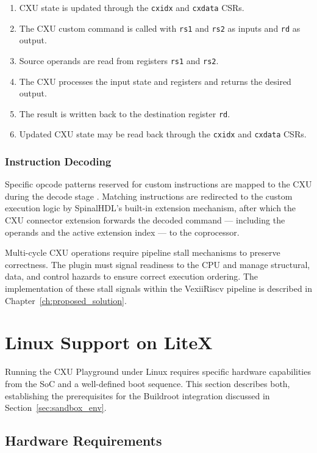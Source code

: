 \begin{enumerate}
    \item CXU state is updated through the \texttt{cxidx} and \texttt{cxdata} CSRs.
    \item The CXU custom command is called with \texttt{rs1} and \texttt{rs2} as inputs and \texttt{rd} as output.
    \item Source operands are read from registers \texttt{rs1} and \texttt{rs2}.
    \item The CXU processes the input state and registers and returns the desired output.
    \item The result is written back to the destination register \texttt{rd}.
    \item Updated CXU state may be read back through the \texttt{cxidx} and \texttt{cxdata} CSRs.
\end{enumerate}

\subsubsection{Instruction Decoding}

Specific opcode patterns reserved for custom instructions are mapped to the CXU during
the decode stage \cite{SpinalHDL2018}.
Matching instructions are redirected to the custom execution logic by SpinalHDL's
built-in extension mechanism, after which the CXU connector extension forwards the
decoded command --- including the operands and the active extension index --- to the
coprocessor.

Multi-cycle CXU operations require pipeline stall mechanisms to preserve correctness.
The plugin must signal readiness to the CPU and manage structural, data, and control
hazards to ensure correct execution ordering.
The implementation of these stall signals within the VexiiRiscv pipeline is described
in Chapter~\ref{ch:proposed_solution}.

\section{Linux Support on LiteX}
\label{sec:linux_litex}

Running the CXU Playground under Linux requires specific hardware capabilities from
the SoC and a well-defined boot sequence.
This section describes both, establishing the prerequisites for the Buildroot integration
discussed in Section~\ref{sec:sandbox_env}.

\subsection{Hardware Requirements}
\label{subsec:hw_requirements}

